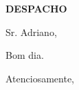 \documentclass[spf]{matletter}
\date{5 de maio de 2018}
\begin{document}
\begin{letter}{\textbf{DESPACHO}}

\opening{Sr. Adriano,}

Bom dia.


\closing{Atenciosamente,}
\end{letter}
\end{document}
